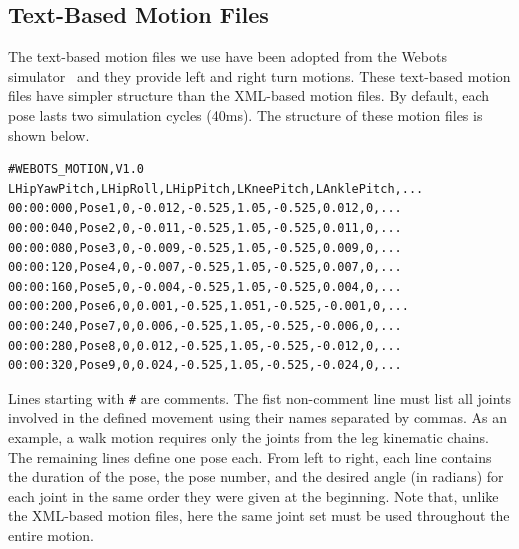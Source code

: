 \subsection{Text-Based Motion Files}
The text-based motion files we use have been adopted from the Webots simulator~\cite{Webots04} and they provide left and right turn motions. These text-based motion files have simpler structure than the XML-based motion files. By default, each pose lasts two simulation cycles (40ms). The structure of these motion files is shown below.
\begin{verbatim}
#WEBOTS_MOTION,V1.0
LHipYawPitch,LHipRoll,LHipPitch,LKneePitch,LAnklePitch,...
00:00:000,Pose1,0,-0.012,-0.525,1.05,-0.525,0.012,0,...
00:00:040,Pose2,0,-0.011,-0.525,1.05,-0.525,0.011,0,...
00:00:080,Pose3,0,-0.009,-0.525,1.05,-0.525,0.009,0,...
00:00:120,Pose4,0,-0.007,-0.525,1.05,-0.525,0.007,0,...
00:00:160,Pose5,0,-0.004,-0.525,1.05,-0.525,0.004,0,...
00:00:200,Pose6,0,0.001,-0.525,1.051,-0.525,-0.001,0,...
00:00:240,Pose7,0,0.006,-0.525,1.05,-0.525,-0.006,0,...
00:00:280,Pose8,0,0.012,-0.525,1.05,-0.525,-0.012,0,...
00:00:320,Pose9,0,0.024,-0.525,1.05,-0.525,-0.024,0,...
\end{verbatim}
Lines starting with \texttt{\#} are comments. The fist non-comment line must list  all joints involved in the defined movement using their names separated by commas. As an example, a walk motion requires only the joints from the leg kinematic chains. The remaining lines define one pose each. From left to right, each line contains the duration of the pose, the pose number, and the desired angle (in radians) for each joint in the same order they were given at the beginning. Note that, unlike the XML-based motion files, here the same joint set must be used throughout the entire motion. 


